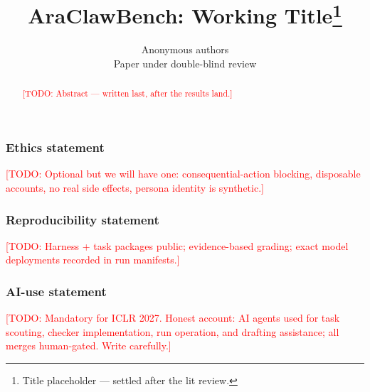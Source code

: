 \documentclass{article} %
\title{AraClawBench: Working Title\thanks{Title placeholder — settled after the lit review.}}
\author{Anonymous authors\\
Paper under double-blind review}
\newcommand{\todo}[1]{\textcolor{red}{[TODO: #1]}}
\begin{document}
\maketitle

\begin{abstract}
\todo{Abstract — written last, after the results land.}
\end{abstract}










\subsubsection*{Ethics statement}
\todo{Optional but we will have one: consequential-action blocking, disposable
accounts, no real side effects, persona identity is synthetic.}

\subsubsection*{Reproducibility statement}
\todo{Harness + task packages public; evidence-based grading; exact model
deployments recorded in run manifests.}

\subsubsection*{AI-use statement}
\todo{Mandatory for ICLR 2027. Honest account: AI agents used for task
scouting, checker implementation, run operation, and drafting assistance;
all merges human-gated. Write carefully.}




\appendix

\end{document}
